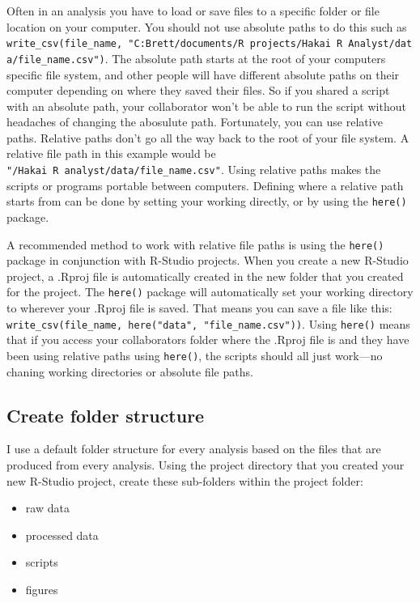\documentclass[]{book}
\providecommand{\tightlist}{%
  \setlength{\itemsep}{0pt}\setlength{\parskip}{0pt}}
\begin{document}
Often in an analysis you have to load or save files to a specific folder
or file location on your computer. You should not use absolute paths to
do this such as
\texttt{write\_csv(file\_name,\ "C:Brett/documents/R\ projects/Hakai\ R\ Analyst/data/file\_name.csv")}.
The absolute path starts at the root of your computers specific file
system, and other people will have different absolute paths on their
computer depending on where they saved their files. So if you shared a
script with an absolute path, your collaborator won't be able to run the
script without headaches of changing the abosulute path. Fortunately,
you can use relative paths. Relative paths don't go all the way back to
the root of your file system. A relative file path in this example would
be \texttt{"/Hakai\ R\ analyst/data/file\_name.csv"}. Using relative
paths makes the scripts or programs portable between computers. Defining
where a relative path starts from can be done by setting your working
directly, or by using the \texttt{here()} package.

A recommended method to work with relative file paths is using the
\texttt{here()} package in conjunction with R-Studio projects. When you
create a new R-Studio project, a .Rproj file is automatically created in
the new folder that you created for the project. The \texttt{here()}
package will automatically set your working directory to wherever your
.Rproj file is saved. That means you can save a file like this:
\texttt{write\_csv(file\_name,\ here("data",\ "file\_name.csv"))}. Using
\texttt{here()} means that if you access your collaborators folder where
the .Rproj file is and they have been using relative paths using
\texttt{here()}, the scripts should all just work---no chaning working
directories or absolute file paths.

\subsection{Create folder structure}\label{create-folder-structure}

I use a default folder structure for every analysis based on the files
that are produced from every analysis. Using the project directory that
you created your new R-Studio project, create these sub-folders within
the project folder:

\begin{itemize}
\tightlist
\item
  raw data
\item
  processed data
\item
  scripts
\item
  figures
\end{itemize}
\end{document}
